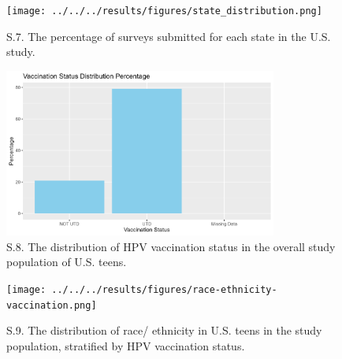 \documentclass[
  letterpaper,
  DIV=11,
  numbers=noendperiod]{scrartcl}
\begin{document}
\begin{figure}[H]

{\centering \texttt{[image: ../../../results/figures/state\_distribution.png]}

}

\caption{S.7. The percentage of surveys submitted for each state in the
U.S. study.}

\end{figure}%
\begin{figure}[H]

{\centering \includegraphics[width=0.8\textwidth,height=\textheight]{../../../results/figures/vaccination.status.distribution.png}

}

\caption{S.8. The distribution of HPV vaccination status in the overall
study population of U.S. teens.}

\end{figure}%
\begin{figure}[H]

{\centering \texttt{[image: ../../../results/figures/race-ethnicity-vaccination.png]}

}

\caption{S.9. The distribution of race/ ethnicity in U.S. teens in the
study population, stratified by HPV vaccination status.}

\end{figure}%
\end{document}
